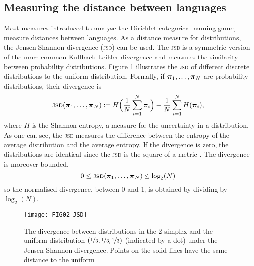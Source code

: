 \documentclass{../src/bcthesispart}
\begin{document}
\subsection{Measuring the distance between languages}




Most measures introduced to analyse the Dirichlet-categorical naming game, measure distances between languages.
As a distance measure for distributions, the Jensen-Shannon divergence (\textsc{jsd}) can be used.
The \textsc{jsd} is a symmetric version of the more common Kullback-Leibler divergence and measures the similarity between probability distributions.
Figure \ref{fig:app-bng:jsd} illustrates the \textsc{jsd} of different discrete distributions to the uniform distribution.
Formally, if $\boldsymbol{\mathbf{\pi}}_1, \dots, \boldsymbol{\mathbf{\pi}}_N$ are probability distributions, their divergence is
\begin{equation}
	\textsc{jsd}(\boldsymbol{\mathbf{\pi}}_1, \dots, \boldsymbol{\mathbf{\pi}}_N)	
		:= H\Bigl( \frac{1}{N} \sum_{i=1}^N \boldsymbol{\mathbf{\pi}}_i \Bigr)	 
			- \frac{1}{N} \sum_{i=1}^N H(\boldsymbol{\mathbf{\pi}}_i),
\end{equation}
where $H$ is the Shannon-entropy, a measure for the uncertainty in a distribution.
As one can see, the \textsc{jsd} measures the difference between the entropy of the average distribution and the average entropy.
If the divergence is zero, the distributions are identical since the \textsc{jsd} is the square of a metric \parencite{Endres2003,Briet2009}.
The divergence is moreover bounded,
\begin{equation}
	0 	\le \textsc{jsd}(\boldsymbol{\mathbf{\pi}}_1, \dots, \boldsymbol{\mathbf{\pi}}_N) 
		\le \log_2(N)	
\end{equation}
so the normalised divergence, between 0 and 1, is obtained by dividing by $\log_2(N)$.




\begin{SCfigure}
	\texttt{[image: FIG02-JSD]}
	\caption{The divergence between distributions in the 2-simplex and the uniform distribution $(\nicefrac{1}{3},\nicefrac{1}{3}, \nicefrac{1}{3})$ (indicated by a dot) under the Jensen-Shannon divergence. Points on the solid lines have the same distance to the uniform 
		\label{fig:app-bng:jsd}}
\end{SCfigure}
\end{document}
